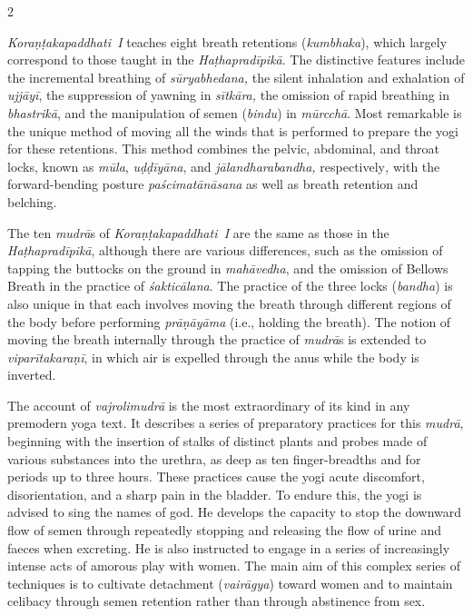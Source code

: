 \begin{nohyp}
\begin{multicols*}{2}
\begin{eng}
\emph{Koraṇṭakapaddhati~I} teaches eight breath retentions (\emph{kumbhaka}), which largely correspond to those taught in the \emph{Haṭhapradīpikā}. The distinctive features include the incremental breathing of \emph{sūryabhedana,} the silent inhalation and exhalation of \emph{ujjāyī}, the suppression of yawning in \emph{sītkāra,} the omission of rapid breathing in \emph{bhastrikā}, and the manipulation of semen (\emph{bindu}) in \emph{mūrcchā}. Most remarkable is the unique method of moving all the winds that is performed to prepare the yogi for these retentions. This method combines the pelvic, abdominal, and throat locks, known as \emph{mūla}, \emph{uḍḍīyāna}, and \emph{jālandharabandha,} respectively\emph{,} with the forward-bending posture \emph{paścimatānāsana} as well as breath retention and belching.

The ten \emph{mudrā}s of \emph{Koraṇṭakapaddhati~I} are the same as those in the \emph{Haṭhapradīpikā}, although there are various differences, such as the omission of tapping the buttocks on the ground in \emph{mahāvedha}, and the omission of Bellows Breath in the practice of \emph{śakticālana}. The practice of the three locks (\emph{bandha}) is also unique in that each involves moving the breath through different regions of the body before performing \emph{prāṇāyāma} (i.e., holding the breath). The notion of moving the breath internally through the practice of \emph{mudrā}s is extended to \emph{viparītakaraṇī}, in which air is expelled through the anus while the body is inverted.

The account of \emph{vajrolimudrā} is the most extraordinary of its kind in any premodern yoga text. It describes a series of preparatory practices for this \emph{mudrā}, beginning with the insertion of stalks of distinct plants and probes made of various substances into the urethra, as deep as ten finger-breadths and for periods up to three hours. These practices cause the yogi acute discomfort, disorientation, and a sharp pain in the bladder. To endure this, the yogi is advised to sing the names of god. He develops the capacity to stop the downward flow of semen through repeatedly stopping and releasing the flow of urine and faeces when excreting. He is also instructed to engage in a series of increasingly intense acts of amorous play with women. The main aim of this complex series of techniques is to cultivate detachment (\emph{vairāgya}) toward women and to maintain celibacy through semen retention rather than through abstinence from sex.
\columnbreak


\end{eng}
\end{multicols*}
\end{nohyp}
